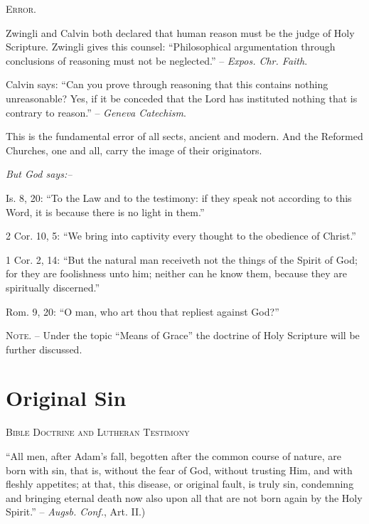 \documentclass[
]{book}
\begin{document}
\begin{center}
\textsc{Error.}
\end{center}

Zwingli and Calvin both declared that human reason must be the judge of Holy Scripture. Zwingli gives this counsel: ``Philosophical argumentation through conclusions of reasoning must not be neglected.'' -- \emph{Expos. Chr. Faith}.

Calvin says: ``Can you prove through reasoning that this contains nothing unreasonable? Yes, if it be conceded that the Lord has instituted nothing that is contrary to reason.'' -- \emph{Geneva Catechism}.

This is the fundamental error of all sects, ancient and modern. And the Reformed Churches, one and all, carry the image of their originators.

\begin{center}
\textsl{But God says:--}
\end{center}

Is. 8, 20: ``To the Law and to the testimony: if they speak not according to this Word, it is because there is no light in them.''

2 Cor. 10, 5: ``We bring into captivity every thought to the obedience of Christ.''

1 Cor. 2, 14: ``But the natural man receiveth not the things of the Spirit of God; for they are foolishness unto him; neither can he know them, because they are spiritually discerned.''

Rom. 9, 20: ``O man, who art thou that repliest against God?''

\textsc{Note.} -- Under the topic ``Means of Grace'' the doctrine of Holy Scripture will be further discussed.

\section*{\texorpdfstring{Original Sin}{Original Sin}}\label{original-sin}

\begin{center}
\textsc{Bible Doctrine and Lutheran Testimony}
\end{center}

``All men, after Adam's fall, begotten after the common course of nature, are born with sin, that is, without the fear of God, without trusting Him, and with fleshly appetites; at that, this disease, or original fault, is truly sin, condemning and bringing eternal death now also upon all that are not born again by the Holy Spirit.'' -- \emph{Augsb. Conf.}, Art. II.)
\end{document}
